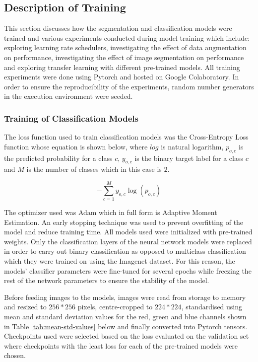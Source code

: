 \documentclass[12pt, a4paper]{article}
\newcommand{\myequations}[1]{%
\addcontentsline{equ}{myequations}{\protect\numberline{\thesection.\theequation}#1}\par}
\begin{document}
\subsection{Description of Training}
This section discusses how the segmentation and classification models were trained and various experiments conducted during model training which include: exploring learning rate schedulers, investigating the effect of data augmentation on performance, investigating the effect of image segmentation on performance and exploring transfer learning with different pre-trained models. All training experiments were done using Pytorch and hosted on Google Colaboratory. In order to ensure the reproducibility of the experiments, random number generators in the execution environment were seeded.

\subsubsection{Training of Classification Models}
The loss function used to train classification models was the Cross-Entropy Loss function whose equation is shown below, where $log$ is natural logarithm, $p_{o,c}$ is the predicted probability for a class $c$, $y_{o,c}$ is the binary target label for a class $c$ and $M$ is the number of classes which in this case is $2$.

\begin{equation}
    -\sum_{c=1}^My_{o,c}\log(p_{o,c})
\end{equation}
\label{eq:5.1}
\myequations{Cross-Entropy loss funtion}

The optimizer used was Adam which in full form is Adaptive Moment Estimation. An early stopping technique was used to prevent overfitting of the model and reduce training time. All models used were initialized with pre-trained weights. Only the classification layers of the neural network models were replaced in order to carry out binary classification as opposed to multiclass classification which they were trained on using the Imagenet dataset. For this reason, the models' classifier parameters were fine-tuned for several epochs while freezing the rest of the network parameters to ensure the stability of the model.

Before feeding images to the models, images were read from storage to memory and resized to $256 * 256$ pixels, centre-cropped to $224 * 224$, standardised using mean and standard deviation values for the red, green and blue channels shown in Table \ref{tab:mean-std-values} below and finally converted into Pytorch tensors. Checkpoints used were selected based on the loss evaluated on the validation set where checkpoints with the least loss for each of the pre-trained models were chosen.
\end{document}
